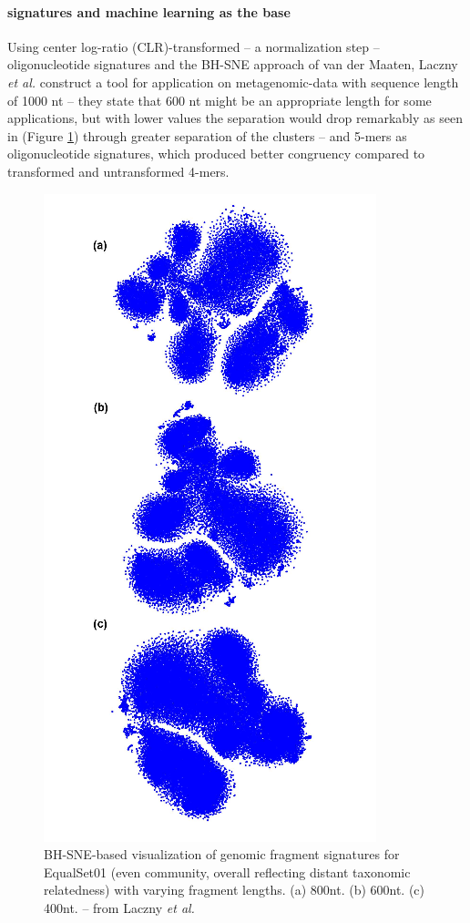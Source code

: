 \documentclass[twocolumn]{bmcart}%
\begin{document}
\paragraph*{signatures and machine learning as the base}
Using center log-ratio (CLR)-transformed -- a normalization step -- oligonucleotide signatures and the BH-SNE approach of van der Maaten, Laczny \textit{et al.} construct a tool for application on metagenomic-data with sequence length of 1000 nt -- they state that 600 nt might be an appropriate length for some applications, but with lower values the separation would drop remarkably as seen in (Figure  \ref{img:seperation}) through greater separation of the clusters -- and 5-mers as oligonucleotide signatures, which produced better congruency compared to transformed and untransformed 4-mers.
\begin{figure}
	\centering
	\includegraphics[width=.6\linewidth]{bilder/seperation.png}
	\caption{BH-SNE-based visualization of genomic fragment signatures for
		EqualSet01 (even community, overall reflecting distant taxonomic relatedness) with varying
		fragment lengths.
		(a) 800nt.  (b) 600nt.  (c) 400nt. -- from Laczny \textit{et al.}\cite{Laczny2014}}
	\label{img:seperation}
\end{figure}
\end{document}
